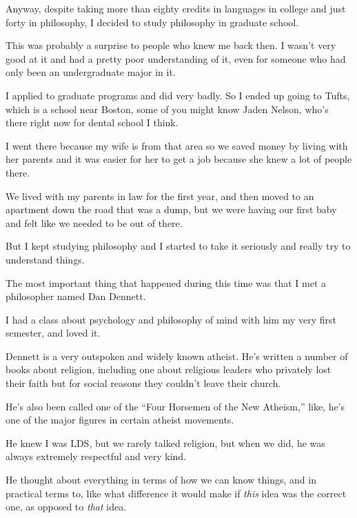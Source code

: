 \begin{compactitem}
			\item Anyway, despite taking more than eighty credits in languages in college and just forty in philosophy, I decided to study philosophy in graduate school.
				\begin{compactitem}
					\item This was probably a surprise to people who knew me back then. I wasn't very good at it and had a pretty poor understanding of it, even for someone who had only been an undergraduate major in it.
					\item I applied to graduate programs and did very badly. So I ended up going to Tufts, which is a school near Boston, some of you might know Jaden Nelson, who's there right now for dental school I think.
					\item I went there because my wife is from that area so we saved money by living with her parents and it was easier for her to get a job because she knew a lot of people there.
					\item We lived with my parents in law for the first year, and then moved to an apartment down the road that was a dump, but we were having our first baby and felt like we needed to be out of there.
					\item But I kept studying philosophy and I started to take it seriously and really try to understand things.
					\item The most important thing that happened during this time was that I met a philosopher named Dan Dennett.
						\begin{compactitem}
							\item I had a class about psychology and philosophy of mind with him my very first semester, and loved it.
							\item Dennett is a very outspoken and widely known atheist. He's written a number of books about religion, including one about religious leaders who privately lost their faith but for social reasons they couldn't leave their church.
							\item He's also been called one of the ``Four Horsemen of the New Atheism,'' like, he's one of the major figures in certain atheist movements.
							\item He knew I was LDS, but we rarely talked religion, but when we did, he was always extremely respectful and very kind.
							\item He thought about everything in terms of how we can know things, and in practical terms to, like what difference it would make if \textit{this} idea was the correct one, as opposed to \textit{that} idea.
						\end{compactitem}
				\end{compactitem}
				

\end{compactitem}
